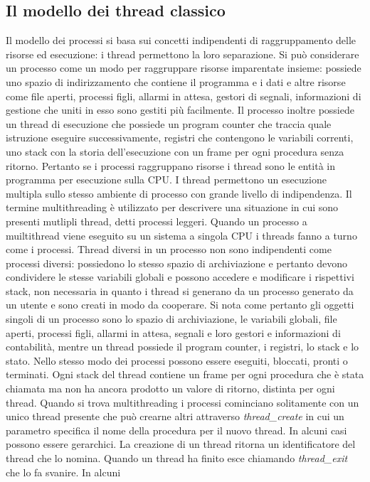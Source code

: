 \subsection{Il modello dei thread classico}
Il modello dei processi si basa sui concetti indipendenti di raggruppamento delle risorse ed esecuzione: i thread permettono la loro separazione. Si pu\`o considerare un processo come
un modo per raggruppare risorse imparentate insieme: possiede uno spazio di indirizzamento che contiene il programma e i dati e altre risorse come file aperti, processi figli, allarmi
in attesa, gestori di segnali, informazioni di gestione che uniti in esso sono gestiti pi\`u facilmente. Il processo inoltre possiede un thread di esecuzione che possiede un program
counter che traccia quale istruzione eseguire successivamente, registri che contengono le variabili correnti, uno stack con la storia dell'esecuzione con un frame per ogni procedura 
senza ritorno. Pertanto se i processi raggruppano risorse i thread sono le entit\`a in programma per esecuzione sulla CPU. I thread permettono un esecuzione multipla sullo stesso 
ambiente di processo con grande livello di indipendenza. Il termine multithreading \`e utilizzato per descrivere una situazione in cui sono presenti mutlipli thread, detti processi 
leggeri. Quando un processo a muiltithread viene eseguito su un sistema a singola CPU i threads fanno a turno come i processi. Thread diversi in un processo non sono indipendenti come
processi diversi: possiedono lo stesso spazio di archiviazione e pertanto devono condividere le stesse variabili globali e possono accedere e modificare i rispettivi stack, non 
necessaria in quanto i thread si generano da un processo generato da un utente e sono creati in modo da cooperare. Si nota come pertanto gli oggetti singoli di un processo sono lo
spazio di archiviazione, le variabili globali, file aperti, processi figli, allarmi in attesa, segnali e loro gestori e informazioni di contabilit\`a, mentre un thread possiede il 
program counter, i registri, lo stack e lo stato. Nello stesso modo dei processi possono essere eseguiti, bloccati, pronti o terminati. Ogni stack del thread contiene un frame per 
ogni procedura che \`e stata chiamata ma non ha ancora prodotto un valore di ritorno, distinta per ogni thread. Quando si trova multithreading i processi cominciano solitamente con un
unico thread presente che pu\`o crearne altri attraverso \emph{thread\_create} in cui un parametro specifica il nome della procedura per il nuovo thread. In alcuni casi possono essere
gerarchici. La creazione di un thread ritorna un identificatore del thread che lo nomina. Quando un thread ha finito esce chiamando \emph{thread\_exit} che lo fa svanire. In alcuni 

